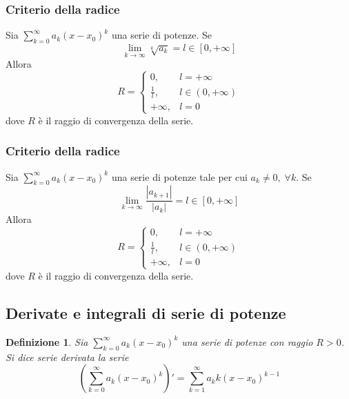 \documentclass{article}
\newtheorem{definition}{Definizione}
\begin{document}
            \subsubsection{Criterio della radice}
                Sia $\sum_{k = 0}^{\infty} a_{k}(x - x_{0})^{k}$ una serie di potenze.
                Se
                \[
                    \lim_{k \rightarrow \infty} \sqrt[k]{a_{k}} = l \in [0, +\infty]
                \]
                Allora
                \[
                    R = \begin{cases}
                        0, & l = +\infty \\
                        \displaystyle \frac{1}{l}, & l \in (0, +\infty) \\
                        +\infty, & l = 0
                    \end{cases}
                \]
                dove $R$ è il raggio di convergenza della serie.

            \vspace{10pt}
            \subsubsection{Criterio della radice}
                Sia $\sum_{k = 0}^{\infty} a_{k}(x - x_{0})^{k}$ una serie di potenze tale per cui $a_{k} \neq 0, \; \forall k$.
                Se
                \[
                    \lim_{k \rightarrow \infty} \frac{|a_{k+1}|}{|a_{k}|} = l \in [0, +\infty]
                \]
                Allora
                \[
                    R = \begin{cases}
                        0, & l = +\infty \\
                        \displaystyle \frac{1}{l}, & l \in (0, +\infty) \\
                        +\infty, & l = 0
                    \end{cases}
                \]
                dove $R$ è il raggio di convergenza della serie.



        \vspace{10pt}
        \subsection{Derivate e integrali di serie di potenze}
            \begin{definition}
                Sia $\sum_{k = 0}^{\infty} a_{k}(x - x_{0})^{k}$ una serie di potenze con raggio $R > 0$.
                Si dice serie derivata la serie
                \[
                    \left( \sum_{k = 0}^{\infty} a_{k}(x - x_{0})^{k}\right)' = \sum_{k = 1}^{\infty} a_{k}k(x - x_{0})^{k - 1}
                \]
            \end{definition}
\end{document}
